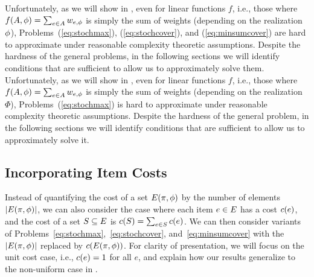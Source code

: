 {Unfortunately, as we will show in , even for
linear functions $f$, i.e., those where $f(A,{\color{black}{\ensuremath{\phi}}})=\sum_{e\in
  A}w_{e,{\color{black}{\ensuremath{\phi}}}}$ is simply the sum of weights (depending on the
realization ${\color{black}{\ensuremath{\phi}}}$), Problems~(\ref{eq:stochmax}),  (\ref{eq:stochcover}),
and (\ref{eq:minsumcover})  
are hard to approximate 
under reasonable complexity theoretic assumptions. 
Despite the hardness of the general problems, 
in the following sections we will identify conditions that are sufficient to 
allow us to approximately solve them.
}{
%
Unfortunately, as we will show in , even for
linear functions $f$, i.e., those where $f(A,{\color{black}{\ensuremath{\phi}}})=\sum_{e\in
  A}w_{e,{\color{black}{\ensuremath{\phi}}}}$ is simply the sum of weights (depending on the
realization $\Phi$), Problems~(\ref{eq:stochmax})
is hard to approximate under reasonable complexity theoretic
assumptions.
Despite the hardness of the general problem, 
in the following sections we will identify conditions that are sufficient to 
allow us to approximately solve it.
}



%
\subsection{Incorporating Item Costs}  
Instead of quantifying the cost of a set $E({\pi}, {{\color{black}{\ensuremath{\phi}}}})$ by
the number of elements $|E({\pi}, {{\color{black}{\ensuremath{\phi}}}})|$, we can also
consider the case where each item $e\in E$ has a 
cost $c(e)$, and the cost of a set
$S\subseteq E$ is $c(S)=\sum_{e\in S}c(e)$. We can
then consider variants of
Problems~\eqref{eq:stochmax},~\eqref{eq:stochcover},
and~\eqref{eq:minsumcover} with the $|E({\pi}, {{\color{black}{\ensuremath{\phi}}}})|$
replaced by 
$c(E({\pi}, {{\color{black}{\ensuremath{\phi}}}}))$. For clarity of presentation, we will focus on the unit cost case, i.e., $c(e)=1$ for all $e$, 
and explain how our results generalize to the non-uniform case in \appendixA.

 


%
%
%
%
%
